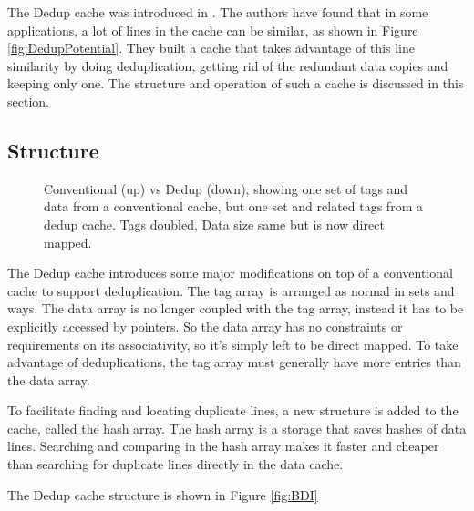 The Dedup cache was introduced in \cite{dedup}. The authors have found that in some applications, a lot of lines in the cache can be similar, as shown in Figure \ref{fig:DedupPotential}. They built a cache that takes advantage of this line similarity by doing deduplication, getting rid of the redundant data copies and keeping only one. The structure and operation of such a cache is discussed in this section.
\subsection{Structure}
\label{ssec:DedupStructure}
\begin{figure}
    \caption[Dedup Cache]{Conventional (up) vs Dedup (down), showing one set of tags and data from a conventional cache, but one set and related tags from a dedup cache. Tags doubled, Data size same but is now direct mapped.}
    \label{fig:Dedup}
\end{figure}
The Dedup cache introduces some major modifications on top of a conventional cache to support deduplication. The tag array is arranged as normal in sets and ways. The data array is no longer coupled with the tag array, instead it has to be explicitly accessed by pointers. So the data array has no constraints or requirements on its associativity, so it's simply left to be direct mapped. To take advantage of deduplications, the tag array must generally have more entries than the data array.\par
To facilitate finding and locating duplicate lines, a new structure is added to the cache, called the hash array. The hash array is a storage that saves hashes of data lines. Searching and comparing in the hash array makes it faster and cheaper than searching for duplicate lines directly in the data cache.

The Dedup cache structure is shown in Figure \ref{fig:BDI}

